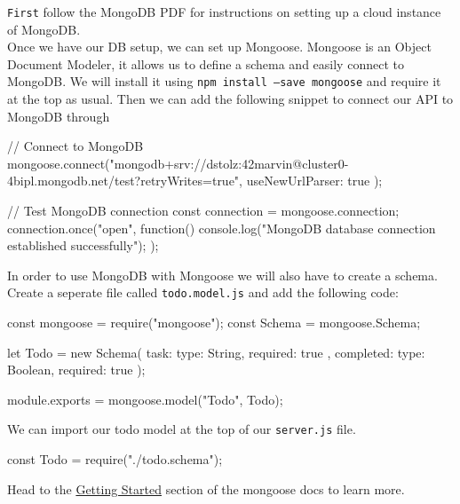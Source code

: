 \documentclass{42-en}
\begin{document}
\texttt{First} follow the MongoDB PDF for instructions on setting up a cloud instance of MongoDB.\\

Once we have our DB setup, we can set up Mongoose. Mongoose is an Object Document Modeler, it allows us to define a schema and easily connect to MongoDB. We will install it using \texttt{npm install --save mongoose} and require it at the top as usual. Then we can add the following snippet to connect our API to MongoDB through 

\begin{42jscode}
	// Connect to MongoDB
	mongoose.connect("mongodb+srv://dstolz:42marvin@cluster0-4bipl.mongodb.net/test?retryWrites=true",
	{ useNewUrlParser: true }
	);
	
	// Test MongoDB connection
	const connection = mongoose.connection;
	connection.once("open", function() {
		console.log("MongoDB database connection established successfully");
		});
	\end{42jscode}
	
	In order to use MongoDB with Mongoose we will also have to create a schema. Create a seperate file called \texttt{todo.model.js} and add the following code:
	
	\begin{42jscode}
		const mongoose = require("mongoose");
		const Schema = mongoose.Schema;
		
		let Todo = new Schema({
			task: {
				type: String,
				required: true
				},
				completed: {
					type: Boolean,
					required: true
					}
					});
					
					module.exports = mongoose.model("Todo", Todo);
				\end{42jscode}
				
				We can import our todo model at the top of our \texttt{server.js} file.
				\begin{42jscode}
					const Todo = require("./todo.schema");
				\end{42jscode}
				
				\newpage
				
				Head to the \href{https://mongoosejs.com/docs/index.html}{Getting Started} section of the mongoose docs to learn more.
				
					
					\newpage
					
					
\end{document}
